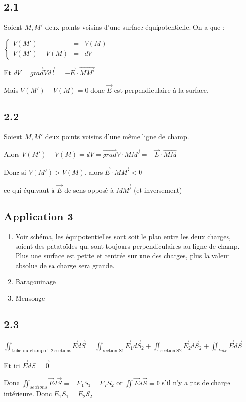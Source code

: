 \documentclass[a4paper,12pt]{book}
\begin{document}
\subsection{2.1}
Soient $M, M'$ deux points voisins d'une surface équipotentielle. On a que : \par $\left\{\begin{array}{ccl} V(M') & = & V(M) \\ V(M')-V(M) & = & dV \end{array}\right.$
\par Et $dV=\vec{grad} Vd\vec{l} = -\vec{E}\cdot\vec{MM'}$
\par Mais $V(M')-V(M)=0$ donc $\vec{E}$ est perpendiculaire à la surface.

\subsection{2.2}
Soient $M,M'$ deux points voisins d'une même ligne de champ. \par Alors $V(M')-V(M)=dV=\vec{grad}V\cdot\vec{MM'}=-\vec{E}\cdot\vec{MM}$
\par Donc si $V(M')>V(M)$, alors $\vec{E}\cdot\vec{MM'}<0$ \par ce qui équivaut à $\vec{E}$ de sens opposé à $\vec{MM'}$ (et inversement)

\subsection{Application 3}
\begin{enumerate}
\item Voir schéma, les équipotentielles sont soit le plan entre les deux charges, soient des patatoïdes qui sont toujours perpendiculaires au ligne de champ. Plus une surface est petite et centrée sur une des charges, plus la valeur absolue de sa charge sera grande. 
\item Baragouinage
\item Mensonge
\end{enumerate}

\subsection{2.3}
$\iint_{\text{tube du champ et 2 sections}} \vec{E}d\vec{S} = \iint_{\text{section S1}}\vec{E}_1d\vec{S}_2 +\iint_{\text{section S2}}\vec{E}_2d\vec{S}_2 + \iint_{tube} \vec{E}d\vec{S}$
\par Et ici $\vec{E}d\vec{S}=\vec{0}$
\par Donc $\iint_{sections} \vec{E}d\vec{S} = -E_1S_1 + E_2S_2$ or $\iint \vec{E}d\vec{S}=0$ s'il n'y a pas de charge intérieure. Donc $E_1S_1= E_2S_2$ 
\end{document}
